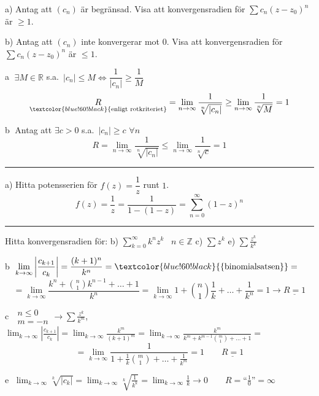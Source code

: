  \quad a) Antag att $(c_n)$ är begränsad. Visa att konvergensradien för $\sum c_n(z - z_0)^n$ är $\ge 1$.

b) Antag att $(c_n)$ inte konvergerar mot $0$. Visa att konvergensradien för $\sum c_n(z - z_0)^n$ är $\le 1$.

\textcircled{a} $\exists M \in \mathbb{R}$ s.a.\ $|c_n| \le M \Leftrightarrow \dfrac{1}{|c_n|} \ge \dfrac{1}{M}$
\[ \underset{\textcolor{blue!60!black}{\text{enligt rotkriteriet}}}{R} = \lim_{n \to \infty} \frac{1}{\sqrt[n]{|c_n|}} \ge \lim_{n \to \infty} \frac{1}{\sqrt[n]{M}} = 1 \]

\textcircled{b} Antag att $\exists c > 0$ s.a.\ $|c_n| \ge c$ $\forall n$
\[ R = \lim_{n \to \infty} \frac{1}{\sqrt[n]{|c_n|}} \le \lim_{n \to \infty} \frac{1}{\sqrt[n]{c}} = 1 \]
\begin{center}
\end{center}

\noindent\rule{\linewidth}{0.4pt}

 \quad a) Hitta potensserien för $f(z) = \dfrac{1}{z}$ runt $1$.
\[ f(z) = \frac{1}{z} = \frac{1}{1 - (1 - z)} = \sum_{n = 0}^\infty (1 - z)^n \]

\noindent\rule{\linewidth}{0.4pt}

 \quad Hitta konvergensradien för: \quad b) $\displaystyle\sum_{k = 0}^\infty k^n z^k$ \ $n \in \mathbb{Z}$ \quad c) $\sum z^k$ \quad e) $\displaystyle\sum \frac{z^k}{k^k}$

\textcircled{b}  \quad $\displaystyle\lim_{k \to \infty} \left| \frac{c_{k+1}}{c_k} \right| = \frac{(k + 1)^n}{k^n} = \textcolor{blue!60!black}{\{\text{binomialsatsen}\}} =$
\[ = \lim_{k \to \infty} \frac{k^n + \binom{n}{1}k^{n-1} + \dots + 1}{k^n} = \lim_{k \to \infty} 1 + \binom{n}{1}\frac{1}{k} + \dots + \frac{1}{k^n} = 1 \to \underline{R = 1} \]

\textcircled{c} $\begin{array}{l} n \le 0 \\ m = -n \end{array} \to \displaystyle\sum \frac{z^k}{k^m}$, \quad $\displaystyle\lim_{k \to \infty} \left| \frac{c_{k+1}}{c_k} \right| = \lim_{k \to \infty} \frac{k^m}{(k + 1)^m} = \lim_{k \to \infty} \frac{k^m}{k^m + k^{m-1}\binom{m}{1} + \dots + 1} =$
\[ = \lim_{k \to \infty} \frac{1}{1 + \frac{1}{k}\binom{m}{1} + \dots + \frac{1}{k^m}} = 1 \qquad \underline{R = 1} \]

\textcircled{e} $\displaystyle\lim_{k \to \infty} \sqrt[k]{|c_k|} = \lim_{k \to \infty} \sqrt[k]{\frac{1}{k^k}} = \lim_{k \to \infty} \frac{1}{k} \to 0 \qquad R = \text{``}\frac{1}{0}\text{''} = \infty$
